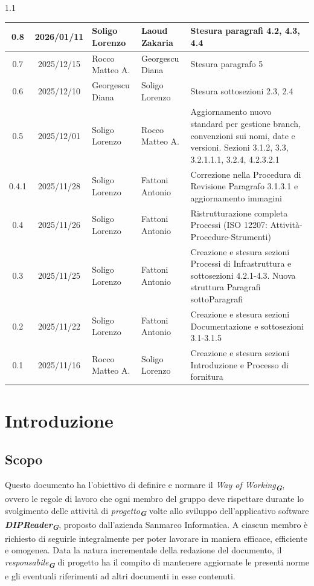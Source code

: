\documentclass[a4paper,12pt]{article}
\newcommand{\glossario}[1]{\textit{#1}\textsubscript{\textbf{\textit{\textcolor{lightblack}{G}}}}}
\begin{document}
\begin{spacing}{1.1}
\begin{longtable}{|c|c|p{3.2cm}|p{3.2cm}|p{5cm}|}
        \hline
        0.8 & 2026/01/11 & Soligo Lorenzo   & Laoud Zakaria & Stesura paragrafi 4.2, 4.3, 4.4 \\
        \hline
        0.7 & 2025/12/15 & Rocco Matteo A.  & Georgescu Diana & Stesura paragrafo 5 \\
        \hline
        0.6 & 2025/12/10 & Georgescu Diana  & Soligo Lorenzo & Stesura sottosezioni 2.3, 2.4 \\
        \hline
        0.5 & 2025/12/01    & Soligo Lorenzo   & Rocco Matteo A.       & Aggiornamento nuovo standard per gestione branch, convenzioni sui nomi, date e versioni. Sezioni 3.1.2, 3.3, 3.2.1.1.1, 3.2.4, 4.2.3.2.1 \\
        \hline
        0.4.1 & 2025/11/28    & Soligo Lorenzo   & Fattoni Antonio       & Correzione nella Procedura di Revisione Paragrafo 3.1.3.1 e aggiornamento immagini \\
        \hline
        0.4 & 2025/11/26    & Soligo Lorenzo   & Fattoni Antonio       & Ristrutturazione completa Processi (ISO 12207: Attività-Procedure-Strumenti) \\
        \hline
        0.3 & 2025/11/25    & Soligo Lorenzo   & Fattoni Antonio       & Creazione e stesura sezioni Processi di Infrastruttura e sottosezioni 4.2.1-4.3. Nuova struttura Paragrafi sottoParagrafi \\
        \hline
        0.2 & 2025/11/22    & Soligo Lorenzo   & Fattoni Antonio & Creazione e stesura sezioni Documentazione e sottosezioni 3.1-3.1.5 \\
        \hline
        0.1 & 2025/11/16    & Rocco Matteo A.  & Soligo Lorenzo & Creazione e stesura sezioni Introduzione e Processo di fornitura \\
        \hline
    \end{longtable}
\end{spacing}
\newpage

\tableofcontents
\listoffigures

\section{Introduzione}

\subsection{Scopo}
Questo documento ha l'obiettivo di definire e normare il \glossario{Way of
    Working}, ovvero le regole di lavoro che ogni membro del gruppo deve rispettare
durante lo svolgimento delle attività di \glossario{progetto} volte allo
sviluppo dell'applicativo software \glossario{\textbf{DIPReader}}, proposto
dall'azienda Sanmarco Informatica. A ciascun membro è richiesto di seguirle
integralmente per poter lavorare in maniera efficace, efficiente e omogenea.
Data la natura incrementale della redazione del documento, il
\glossario{responsabile} di progetto ha il compito di mantenere aggiornate le
presenti norme e gli eventuali riferimenti ad altri documenti in esse
contenuti.
\end{document}
